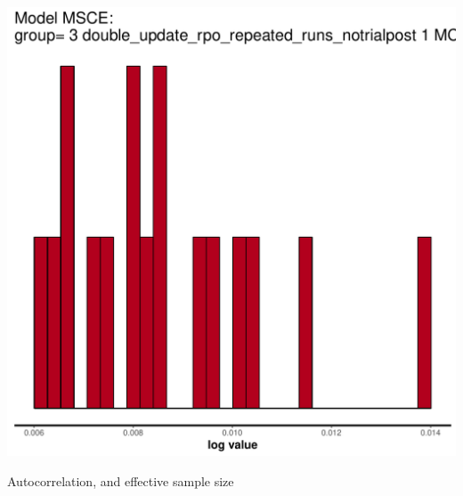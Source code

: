 \documentclass{article}\usepackage[]{graphicx}\usepackage[]{color}
\makeatletter
\def\maxwidth{ %
  \ifdim\Gin@nat@width>\linewidth
    \linewidth
  \else
    \Gin@nat@width
  \fi
}
\newenvironment{knitrout}{}{} %
\makeatother
\begin{document}
\begin{knitrout}
\includegraphics[width=\maxwidth]{figure/unnamed-chunk-12-4} 

\end{knitrout}

Autocorrelation, and effective sample size
\end{document}
